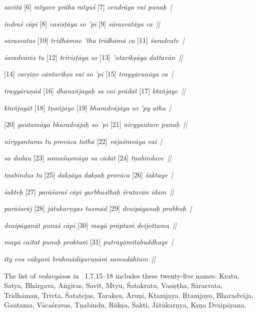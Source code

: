 {{  \textit{savitā }[6]\textit{ mtyave prāha mtyuś }[7]\textit{ cendrāya vai punaḥ~| } 
 
  \textit{indraś cāpi }[8]\textit{ vasiṣṭāya so 'pi }[9]\textit{ sārasvatāya ca~|| } 
 
  \textit{sārasvatas }[10]\textit{ tridhāmne 'tha tridhāmā ca }[11]\textit{ śaradvate~| } 
 
  \textit{śaradvā\.ms tu }[12]\textit{ triviṣṭāya so }[13]\textit{ 'ntarikṣāya dattavān~|| } 
 
  [14]\textit{ carṣiṇe cāntarikṣo vai so 'pi }[15]\textit{ trayyāruṇāya ca~| } 
 
  \textit{trayyāruṇād }[16]\textit{ dhanañjayaḥ sa vai prādāt }[17]\textit{ ktañjaye~|| } 
 
  \textit{ktañjayāt }[18]\textit{ tṇañjayo }[19]\textit{ bharadvājāya so 'py atha~| } 
 
  [20]\textit{ gautamāya bharadvājaḥ so 'pi }[21]\textit{ niryyantare punaḥ~|| } 
 
  \textit{niryyantaras tu provāca tathā }[22]\textit{ vājaśravāya vai~| } 
 
  \textit{sa dadau }[23]\textit{ somaśuṣmāya sa cādāt }[24]\textit{ tṇabindave~|| } 
 
  \textit{tṇabindus tu }[25]\textit{ dakṣāya dakṣaḥ provāca }[26]\textit{ śaktaye~| } 
 
  \textit{śakteḥ }[27]\textit{ parāśaraś cāpi garbhasthaḥ śrutavān idam~|| } 
 
  \textit{parāśarāj }[28]\textit{ jātukarṇyas tasmād }[29]\textit{ dvaipāyanaḥ prabhuḥ~| } 
 
  \textit{dvaipāyanāt punaś cāpi }[30]\textit{ mayā prāpta\.m dvijottama~|| } 
 
  \textit{mayā caitat punaḥ prokta\.m }[31]\textit{ putrāyāmitabuddhaye~| } 
 
  \textit{ity eva vākya\.m brahmādiguruṇā\.m samudāhtam~||} 
 
  
 
  The list of \textit{vedavyāsa}s in \LinPu\ 1.7.15--18 includes these twenty-five names:
  Kratu, Satya, Bhārgava, Aṅgiras, Savit,
  Mtyu, Śatakratu, Vasiṣṭha, Sārasvata, Tridhāman,
  Trivta, Śatatejas, Tarakṣu, Āruṇi, Kta\.mjaya,
  Ṛta\.mjayo, Bharadvāja, Gautama, Vācaśravas, Tṇabindu,
  Rūkṣa, Śakti, Jātūkarṇya, Kṣṇa Dvaipāyana.
 }}

